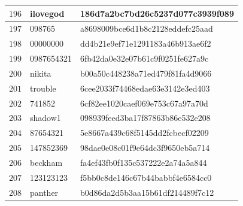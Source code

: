 \begin{longtable}{|l|l|l|}
    $196$ & ilovegod & 186d7a2bc7bd26c5237d077c3939f089 \\ \hline
    $197$ & 098765 & a8698009bce6d1b8c2128eddefc25aad \\ \hline
    $198$ & 00000000 & dd4b21e9ef71e1291183a46b913ae6f2 \\ \hline
    $199$ & 0987654321 & 6fb42da0e32e07b61c9f0251fe627a9c \\ \hline
    $200$ & nikita & b00a50c448238a71ed479f81fa4d9066 \\ \hline
    $201$ & trouble & 6cee2033f74468edae63e3142e3ed403 \\ \hline
    $202$ & 741852 & 6cf82ee1020caef069e753c67a97a70d \\ \hline
    $203$ & shadow1 & 098939feed3ba17f87863b86e532e208 \\ \hline
    $204$ & 87654321 & 5e8667a439c68f5145dd2fcbecf02209 \\ \hline
    $205$ & 147852369 & 98dae0e08c01f9e64dc3f9650eb5a714 \\ \hline
    $206$ & beckham & fa4ef43fb0f135c537222e2a74a5a844 \\ \hline
    $207$ & 123123123 & f5bb0c8de146c67b44babbf4e6584cc0 \\ \hline
    $208$ & panther & b0d86da2d5b3aa15b61df214489f7c12 \\ \hline

\end{longtable}
